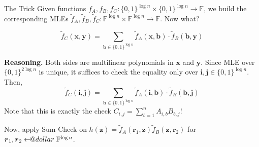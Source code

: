 \documentclass{zkdl-presentation-template}
\makeatletter
\newcommand\leftarrowS{\leftarrow\joinrel\smalldollar}
\newcommand{\smalldollar}{\mathrel{\mathpalette\small@dollar\relax}}
\newcommand{\small@dollar}[2]{%
  \vcenter{\hbox{%
    $#1\textnormal{\fontsize{0.7\dimexpr\f@size pt}{0}\selectfont\$}$%
  }}%
}
\makeatother
\begin{document}
    \begin{frame}{The Trick}
        Given functions $f_A,f_B,f_C: \{0,1\}^{\log n} \times \{0,1\}^{\log n}
        \to \mathbb{F}$, we build the corresponding MLEs $\widetilde{f}_A,
        \widetilde{f}_B, \widetilde{f}_C: \mathbb{F}^{\log n} \times
        \mathbb{F}^{\log n} \to \mathbb{F}$. Now what?

        \begin{lemma}
            \begin{equation*}
                \widetilde{f}_C(\mathbf{x}, \mathbf{y}) = \sum_{\boldsymbol{b} \in
            \{0,1\}^{\log
            n}}\widetilde{f}_A(\mathbf{x},\boldsymbol{b})\cdot\widetilde{f}_B(\boldsymbol{b},\mathbf{y})
            \end{equation*}
        \end{lemma}

        \textcolor{gray!90!black}{\textbf{Reasoning.} Both sides are multilinear polynomials in
        $\mathbf{x}$ and $\mathbf{y}$. Since MLE over $\{0,1\}^{2\log n}$ is
        unique, it suffices to check the equality only over
        $\boldsymbol{i},\boldsymbol{j} \in \{0,1\}^{\log n}$. Then,
        \begin{equation*}
            \widetilde{f}_C(\boldsymbol{i}, \boldsymbol{j}) = \sum_{\boldsymbol{b} \in
            \{0,1\}^{\log
            n}}\widetilde{f}_A(\boldsymbol{i},\boldsymbol{b})\cdot\widetilde{f}_B(\boldsymbol{b},\boldsymbol{j})
        \end{equation*}
        Note that this is exactly the check $C_{i,j} = \sum_{b=1}^n A_{i,b}B_{b,j}$!}

        Now, apply Sum-Check on $h(\mathbf{z}) =
        \widetilde{f}_A(\boldsymbol{r}_1,\mathbf{z})\widetilde{f}_B(\mathbf{z},\boldsymbol{r}_2)$
        for $\boldsymbol{r}_1,\boldsymbol{r}_2 \leftarrowS \mathbb{F}^{\log n}$.
    \end{frame}
\end{document}
